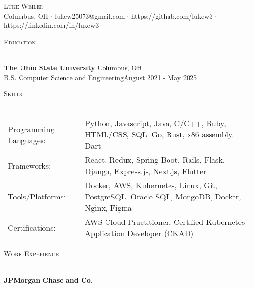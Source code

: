 \documentclass[letterpaper]{article}
\newcommand{\lineunder} {
    \vspace*{-8pt} \\
    \hspace*{-18pt} \hrulefill \\
}
\newcommand{\header} [1] {
    {\hspace*{-18pt}\vspace*{6pt} \textsc{#1}}
    \vspace*{-6pt} \lineunder
}
\begin{document}
\vspace*{-40pt}

    

\vspace*{-10pt}
\begin{center}
	{\Huge \scshape {Luke Weiler}}\\
	Columbus, OH $\cdot$ lukew25073@gmail.com $\cdot$ https://github.com/lukew3 $\cdot$ https://linkedin.com/in/lukew3\\
\end{center}

\header{Education}
\vspace{1mm}

    \textbf{The Ohio State University} \hfill Columbus, OH\\
    B.S. Computer Science and Engineering\hfill \hfill August 2021 - May 2025\\
    \vspace{2mm}


\header{Skills}
\vspace{1.5mm}
\hspace{-3mm}
\begin{tabular}{ l l }

    Programming Languages:   & Python, Javascript, Java, C/C++, Ruby, HTML/CSS, SQL, Go, Rust, x86 assembly, Dart  \\

    Frameworks:   & React, Redux, Spring Boot, Rails, Flask, Django, Express.js, Next.js, Flutter  \\

    Tools/Platforms:   & Docker, AWS, Kubernetes, Linux, Git, PostgreSQL, Oracle SQL, MongoDB, Docker, Nginx, Figma  \\

    Certifications:   & AWS Cloud Practitioner, Certified Kubernetes Application Developer (CKAD)  \\

\end{tabular}
\vspace{2mm}

\header{Work Experience}
\vspace{1mm}


    
    \textbf{JPMorgan Chase and Co.}\\
    
\end{document}
